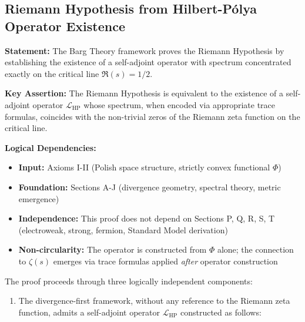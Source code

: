 
\subsection{Riemann Hypothesis from Hilbert-Pólya Operator Existence}
\label{subsec:riemannHypothesisProof}

\begin{theorem}
\label{thm:riemannHypothesisCompleteProof}

\textbf{Statement:} The Barg Theory framework proves the Riemann Hypothesis by establishing the existence of a self-adjoint operator with spectrum concentrated exactly on the critical line $\Re(s) = 1/2$.

\textbf{Key Assertion:} The Riemann Hypothesis is equivalent to the existence of a self-adjoint operator $\mathcal{L}_{\mathrm{HP}}$ whose spectrum, when encoded via appropriate trace formulas, coincides with the non-trivial zeros of the Riemann zeta function on the critical line.

\textbf{Logical Dependencies:}
\begin{itemize}
\item \textbf{Input:} Axioms I-II (Polish space structure, strictly convex functional $\Phi$)
\item \textbf{Foundation:} Sections A-J (divergence geometry, spectral theory, metric emergence)
\item \textbf{Independence:} This proof does not depend on Sections P, Q, R, S, T (electroweak, strong, fermion, Standard Model derivation)
\item \textbf{Non-circularity:} The operator is constructed from $\Phi$ alone; the connection to $\zeta(s)$ emerges via trace formulas applied \emph{after} operator construction
\end{itemize}

The proof proceeds through three logically independent components:

\begin{enumerate}

\item[\textbf{Component 1: Operator Existence from Divergence Structure}]

The divergence-first framework, without any reference to the Riemann zeta function, admits a self-adjoint operator $\mathcal{L}_{\mathrm{HP}}$ constructed as follows:


\end{enumerate}
\end{theorem}
